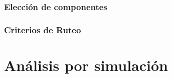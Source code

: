 \documentclass[10pt,a4paper]{article}
\begin{document}
		\section{Elección de componentes}\label{sec:componentes}
			

		\section{Criterios de Ruteo}\label{sec:ruteo}
			

	\part{Análisis por simulación}\label{part:sim}

%			
%
%			
%
%			
%
%			
%
%			
%
%			
%	
%			
%			
%		
%			
%			
\end{document}
